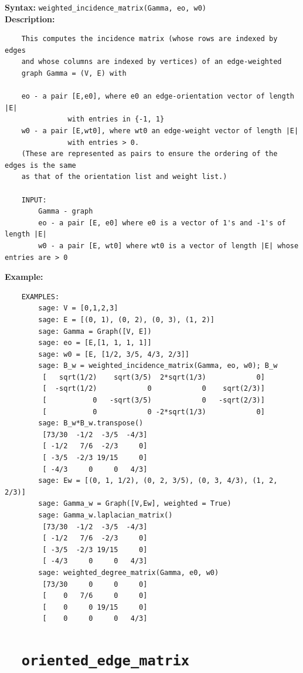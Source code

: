 \documentclass{article}
\begin{document}
\textbf{Syntax:} \verb}weighted_incidence_matrix(Gamma, eo, w0)}\\

\textbf{Description:}
\begin{verbatim}
    This computes the incidence matrix (whose rows are indexed by edges
    and whose columns are indexed by vertices) of an edge-weighted
    graph Gamma = (V, E) with 

    eo - a pair [E,e0], where e0 an edge-orientation vector of length |E|
               with entries in {-1, 1}
    w0 - a pair [E,wt0], where wt0 an edge-weight vector of length |E|
               with entries > 0. 
    (These are represented as pairs to ensure the ordering of the edges is the same 
    as that of the orientation list and weight list.)

    INPUT:
        Gamma - graph
        eo - a pair [E, e0] where e0 is a vector of 1's and -1's of length |E|
        w0 - a pair [E, wt0] where wt0 is a vector of length |E| whose entries are > 0
\end{verbatim}

\textbf{Example:}
\begin{verbatim}
    EXAMPLES:
        sage: V = [0,1,2,3]
        sage: E = [(0, 1), (0, 2), (0, 3), (1, 2)]
        sage: Gamma = Graph([V, E])
        sage: eo = [E,[1, 1, 1, 1]]
        sage: w0 = [E, [1/2, 3/5, 4/3, 2/3]]
        sage: B_w = weighted_incidence_matrix(Gamma, eo, w0); B_w
         [   sqrt(1/2)    sqrt(3/5)  2*sqrt(1/3)            0]
         [  -sqrt(1/2)            0            0    sqrt(2/3)]
         [           0   -sqrt(3/5)            0   -sqrt(2/3)]
         [           0            0 -2*sqrt(1/3)            0]
        sage: B_w*B_w.transpose()
         [73/30  -1/2  -3/5  -4/3]
         [ -1/2   7/6  -2/3     0]
         [ -3/5  -2/3 19/15     0]
         [ -4/3     0     0   4/3]
        sage: Ew = [(0, 1, 1/2), (0, 2, 3/5), (0, 3, 4/3), (1, 2, 2/3)]
        sage: Gamma_w = Graph([V,Ew], weighted = True)
        sage: Gamma_w.laplacian_matrix()
         [73/30  -1/2  -3/5  -4/3]
         [ -1/2   7/6  -2/3     0]
         [ -3/5  -2/3 19/15     0]
         [ -4/3     0     0   4/3]
        sage: weighted_degree_matrix(Gamma, e0, w0)
         [73/30     0     0     0]
         [    0   7/6     0     0]
         [    0     0 19/15     0]
         [    0     0     0   4/3]
\end{verbatim}


\section{\tt \ \ oriented\_edge\_matrix}
\end{document}
